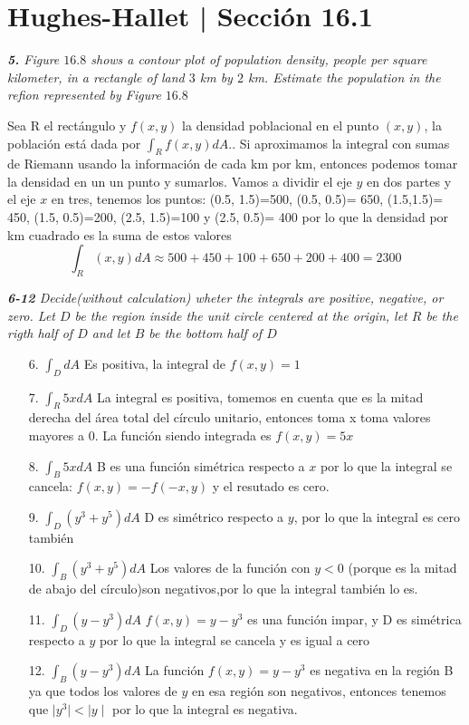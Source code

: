 \documentclass[a4paper,12pt]{article}
\begin{document}
	\section{Hughes-Hallet | Sección 16.1}
	\textit{\textbf{5.} Figure $16.8$ shows a contour plot of population density, people per square kilometer, in a rectangle of land $3$ km by $2$ km. Estimate the population in the refion represented by Figure $16.8$}

Sea R el rectángulo y $f(x,y)$ la densidad poblacional en el punto $(x,y)$, la población está dada por $\int_{R}f(x,y)dA$.. Si aproximamos la integral con sumas de Riemann usando la información de cada km por km, entonces podemos tomar la densidad en un un punto y sumarlos.
Vamos a dividir el eje $y$ en dos partes y el eje $x$ en tres, tenemos los puntos:
(0.5, 1.5)=500, (0.5, 0.5)= 650, (1.5,1.5)= 450, (1.5, 0.5)=200, (2.5, 1.5)=100 y (2.5, 0.5)= 400
por lo que la densidad por km cuadrado es la suma de estos valores
\[\int_{R}(x,y)dA\approx 500 + 450 + 100 + 650 + 200 + 400 = 2300\]

\textit{\textbf{6-12} Decide(without calculation) wheter the integrals are positive, negative, or zero. Let $D$ be the region inside the unit circle centered at the origin, let $R$ be the rigth half of $D$ and let $B$ be the bottom half of $D$}
\begin{itemize}
	\item[6.]$\int_{D}dA$
	         Es positiva, la integral de $f(x,y) = 1$
	\item[7.]$\int_{R}5xdA$
			  La integral es positiva, tomemos en cuenta que es la mitad derecha del área total del círculo unitario, entonces toma x toma valores mayores a $0$. La función siendo integrada es $f(x,y) = 5x$
	\item[8.]$\int_{B}5xdA$
			  B es una función simétrica respecto a $x$ por lo que la integral se cancela: $f(x,y) = -f (-x,y)$ y el resutado es cero.
	\item[9.]$\int_{D}(y^3 + y^5)dA$
		  	   D es simétrico respecto a $y$, por lo que la integral es cero también
	\item[10.]$\int_{B}(y^3+y^5)dA$
			   Los valores de la función con $y < 0$ (porque es la mitad de abajo del círculo)son negativos,por lo que la integral también lo es.
	\item[11.]$\int_{D}(y-y^3)dA$
				$f(x,y) = y- y^3$ es una función impar, y D es simétrica respecto a $y$ por lo que la integral se cancela y es igual a cero
	\item[12.]$\int_{B}(y-y^3)dA$
			 La función $f(x,y) = y -y^3$ es negativa en la región B ya que todos los valores de $y$ en esa región son negativos, entonces tenemos que $\mid y^3 \mid < \mid y \mid$ por lo que la integral es negativa.
\end{itemize}
\end{document}
